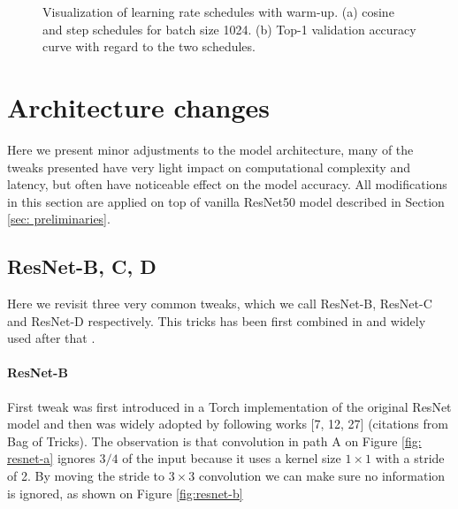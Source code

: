 \begin{figure}[t!]
  \centering
  \caption{Visualization of learning rate schedules with warm-up. (a) cosine and step schedules for batch size 1024. (b) Top-1 validation accuracy curve with regard to the two schedules.}
  \label{fig:learning-rate-curve}
\end{figure}







\section{Architecture changes}

Here we present minor adjustments to the model architecture, many of the tweaks presented have very light impact on computational complexity and latency, but often have noticeable effect on the model accuracy. All modifications in this section are applied on top of vanilla ResNet50 model described in Section \ref{sec: preliminaries}.

\subsection{ResNet-B, C, D}
Here we revisit three very common tweaks, which we call ResNet-B, ResNet-C and ResNet-D respectively. This tricks has been first combined in \cite{he2019_bag_of_tricks} and widely used after that \cite{ridnik2021_tresnet} \cite{bello2021_revisiting_resnet}. 

\paragraph{ResNet-B}
First tweak was first introduced in a Torch implementation of the original ResNet model and then was widely adopted by following works [7, 12, 27] (citations from Bag of Tricks). The observation is that convolution in path A on Figure \ref{fig: resnet-a} ignores $3/4$ of the input because it uses a kernel size $1 \times 1$ with a stride of 2. By moving the stride to $3 \times 3$ convolution we can make sure no information is ignored, as shown on Figure \ref{fig:resnet-b}

